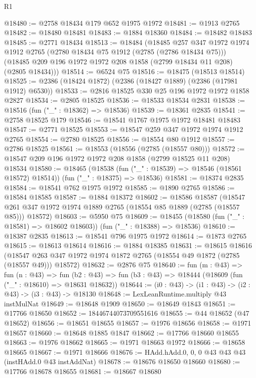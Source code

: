 \begin{lexlean}{R1}
\begin{coremodule}
@18480 := @2758 @18434 @179 @652 @1975 @1972
@18481 := @1913 @2765
@18482 := @18480 @18481
@18483 := @1884 @18360
@18484 := @18482 @18483
@18485 := @2771 @18434
@18513 := @18484
    (@18485
      @257
      @347
      @1972
      @1974
      @1912
      @2765
      (@2780 @18434 @75 @1912 (@2785 (@2786 @18434 @75)))
      (@18485 @209 @196 @1972 @1972 @208 @1858 (@2799 @18434 @11 @208) (@2805 @18434)))
@18514 := @6524 @75
@18516 := @18475 (@18513 @18514)
@18525 := @2386 (@18424 @1872) (@2386 (@18427 @1889) (@2386 (@17981 @1912) @6530))
@18533 := @2816 @18525 @330 @25 @196 @1972 @1972 @1858 @2827
@18534 := @2805 @18525
@18536 := @18533 @18534 @2831
@18538 := @18516 (fun ("_" : @18362) => @18536)
@18539 := @18361 @2835
@18541 := @2758 @18525 @179
@18546 := @18541 @1767 @1975 @1972 @18481 @18483
@18547 := @2771 @18525
@18553 := @18547 @259 @347 @1972 @1974 @1912 @2765
@18554 := @2780 @18525
@18556 := @18554 @80 @1912
@18557 := @2786 @18525
@18561 := @18553 (@18556 (@2785 (@18557 @80)))
@18572 := @18547 @209 @196 @1972 @1972 @208 @1858 (@2799 @18525 @11 @208) @18534
@18580 := @18465
    (@18538 (fun ("_" : @18539) => @18546 (@18561 @18572) @18514))
    (fun ("_" : @18375) => @18536)
@18581 := @18374 @2835
@18584 := @18541 @762 @1975 @1972
@18585 := @1890 @2765
@18586 := @18584 @18585
@18587 := @1884 @18372
@18602 := @18586
    @18587
    (@18547 @261 @347 @1972 @1974 @1889 @2765 (@18554 @85 @1889 (@2785 (@18557 @85))) @18572)
@18603 := @5950 @75
@18609 := @18455 (@18580 (fun ("_" : @18581) => @18602 @18603)) (fun ("_" : @18388) => @18536)
@18610 := @18387 @2835
@18613 := @18541 @796 @1975 @1972
@18614 := @1873 @2765
@18615 := @18613 @18614
@18616 := @1884 @18385
@18631 := @18615
    @18616
    (@18547 @263 @347 @1972 @1974 @1872 @2765 (@18554 @49 @1872 (@2785 (@18557 @49))) @18572)
@18632 := @2876 @75
@18640 := fun (m : @43) =>
  fun (n : @43) =>
  fun (b2 : @43) => fun (b3 : @43) => @18444 (@18609 (fun ("_" : @18610) => @18631 @18632))
@18644 := (i0 : @43) -> (i1 : @43) -> (i2 : @43) -> (i3 : @43) -> @18130
@18648 := LexLeanRuntime.multiply @43 instMulNat
@18649 := @18648 @1909
@18650 := @18649 @1843
@18651 := @17766 @18650
@18652 := 18446744073709551616
@18655 := @44 @18652 (@47 @18652)
@18656 := @18651 @18655
@18657 := @1976 @18656
@18658 := @1971 @18657
@18660 := @18648 @1885 @1847
@18662 := @17766 @18660 @18655
@18663 := @1976 @18662
@18665 := @1971 @18663 @1972
@18666 := @18658 @18665
@18667 := @1971 @18666
@18676 := HAdd.hAdd.{0, 0, 0} @43 @43 @43 (instHAdd.{0} @43 instAddNat)
@18678 := @18676 @18650 @18660
@18680 := @17766 @18678 @18655
@18681 := @18667 @18680

\end{coremodule}
\end{lexlean}
